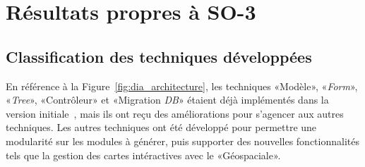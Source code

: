 \section{Résultats propres à SO-3}

\subsection{Classification des techniques développées}\label{result_technique_developpe}

En référence à la Figure~\ref{fig:dia_architecture}, les techniques «Modèle», «\textit{Form}», «\textit{Tree}», «Contrôleur» et «Migration \textit{DB}» étaient déjà implémentés dans la version initiale~\cite{bluiksnot_repo}, mais ils ont reçu des améliorations pour s’agencer aux autres techniques. Les autres techniques ont été développé pour permettre une modularité sur les modules à générer, puis supporter des nouvelles fonctionnalités tels que la gestion des cartes intéractives avec le «Géospaciale».


